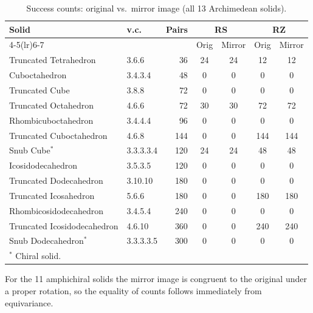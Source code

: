 \documentclass[12pt,a4paper]{article}
\theoremstyle{definition}
\begin{document}
\begin{table}[h]
\centering
\caption{Success counts: original vs.\ mirror image (all 13 Archimedean solids).}
\label{tab:mirror}
\small
\setlength{\tabcolsep}{4pt}
\begin{tabular}{llrcccc}
\toprule
Solid & v.c. & Pairs & \multicolumn{2}{c}{RS} & \multicolumn{2}{c}{RZ} \\
\cmidrule(lr){4-5}\cmidrule(lr){6-7}
 & & & Orig & Mirror & Orig & Mirror \\
\midrule
Truncated Tetrahedron       & 3.6.6       &  36 & 24 & 24 & 12 & 12 \\
Cuboctahedron               & 3.4.3.4     &  48 &  0 &  0 &  0 &  0 \\
Truncated Cube              & 3.8.8       &  72 &  0 &  0 &  0 &  0 \\
Truncated Octahedron        & 4.6.6       &  72 & 30 & 30 & 72 & 72 \\
Rhombicuboctahedron         & 3.4.4.4     &  96 &  0 &  0 &  0 &  0 \\
Truncated Cuboctahedron     & 4.6.8       & 144 &  0 &  0 &144 &144 \\
Snub Cube$^*$               & 3.3.3.3.4   & 120 & 24 & 24 & 48 & 48 \\
Icosidodecahedron           & 3.5.3.5     & 120 &  0 &  0 &  0 &  0 \\
Truncated Dodecahedron      & 3.10.10     & 180 &  0 &  0 &  0 &  0 \\
Truncated Icosahedron       & 5.6.6       & 180 &  0 &  0 &180 &180 \\
Rhombicosidodecahedron      & 3.4.5.4     & 240 &  0 &  0 &  0 &  0 \\
Truncated Icosidodecahedron & 4.6.10      & 360 &  0 &  0 &240 &240 \\
Snub Dodecahedron$^*$       & 3.3.3.3.5   & 300 &  0 &  0 &  0 &  0 \\
\bottomrule
\multicolumn{7}{l}{\small$^*$ Chiral solid.}
\end{tabular}
\end{table}

For the 11 amphichiral solids the mirror image is congruent to the original
under a proper rotation, so the equality of counts follows immediately from
equivariance.
\end{document}

